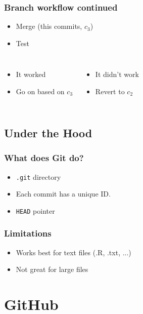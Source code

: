 \documentclass{beamer}
\begin{document}
\begin{frame}[fragile]
    \frametitle{Branch workflow continued}
    \begin{itemize}
        \item Merge (this commits, $c_3$)
        \item Test
    \end{itemize}
    \begin{columns}
        \begin{itemize}
        \item It worked
        \item Go on based on $c_3$
        \end{itemize}
        \begin{itemize}
            \item It didn't work
            \item Revert to $c_2$
        \end{itemize}
    \end{columns}
\end{frame}

\subsection{Under the Hood}

\begin{frame}[fragile]
    \frametitle{What does Git do?}
    \begin{itemize}
        \item \verb|.git| directory
        \item Each commit has a unique ID. 
        \item \verb|HEAD| pointer
    \end{itemize}
\end{frame}

\begin{frame}
    \frametitle{Limitations}
    \begin{itemize}
        \item Works best for text files (.R, .txt, ...)
        \item Not great for large files 
    \end{itemize}
\end{frame}

\section{GitHub}
\end{document}
